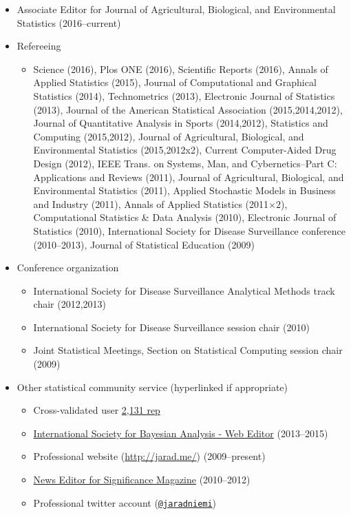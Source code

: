 \documentclass[overlapped,line]{res}
\begin{document}
\begin{resume}
\begin{itemize}
\item Associate Editor for Journal of Agricultural, Biological, and Environmental Statistics (2016--current)
\item Refereeing
 \begin{itemize}
 \item Science (2016), 
 Plos ONE (2016), 
 Scientific Reports (2016), 
 Annals of Applied Statistics (2015), 
 Journal of Computational and Graphical Statistics (2014), 
 Technometrics (2013), 
 Electronic Journal of Statistics (2013), 
 Journal of the American Statistical Association (2015,2014,2012), 
 Journal of Quantitative Analysis in Sports (2014,2012), 
 Statistics and Computing (2015,2012), 
 Journal of Agricultural, Biological, and Environmental Statistics (2015,2012x2), 
 Current Computer-Aided Drug Design (2012), 
 IEEE Trans. on Systems, Man, and Cybernetics--Part C: Applications and Reviews (2011), 
 Journal of Agricultural, Biological, and Environmental Statistics (2011), 
 Applied Stochastic Models in Business and Industry (2011), 
 Annals of Applied Statistics  (2011$\times 2$), 
 Computational Statistics \& Data Analysis (2010), 
 Electronic Journal of Statistics (2010), 
 International Society for Disease Surveillance conference (2010--2013), 
 Journal of Statistical Education (2009)
 \end{itemize}
 
 

 
\item Conference organization
 \begin{itemize}
 \item International Society for Disease Surveillance Analytical Methods track chair (2012,2013)
 \item International Society for Disease Surveillance session chair (2010)
 \item Joint Statistical Meetings, Section on Statistical Computing session chair (2009)
 \end{itemize}
\item Other statistical community service (hyperlinked if appropriate)
 \begin{itemize}
 \item Cross-validated user \href{http://stats.stackexchange.com/users/40440/jaradniemi}{2,131 rep}
 \item \href{http://bayesian.org/}{International Society for Bayesian Analysis -  Web Editor} (2013--2015)
 \item Professional website (\url{http://jarad.me/}) (2009--present)
 \item \href{http://www.significancemagazine.org/view/searchResults.html?s=&t=&q=jarad+niemi}{News Editor for Significance Magazine} (2010--2012)
 \item Professional twitter account ({\tt \href{https://twitter.com/jaradniemi}{@jaradniemi}})
 \end{itemize}


\end{itemize}
\end{resume}
\end{document}
